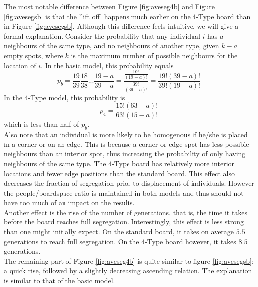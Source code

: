 The most notable difference between Figure \ref{fig:aveseg4b} and Figure \ref{fig:avesegsb} is that the 'lift off' happens much earlier on the 4-Type board than in Figure \ref{fig:avesegsb}. 
Although this difference feels intuitive, we will give a formal explanation. 
Consider the probability that any individual $i$ has $a$ neighbours of the same type, and no neighbours of another type, given $k-a$ empty spots, where $k$ is the maximum number of possible neighbours for the location of $i$. 
In the basic model, this probability equals
\[
p_b = \frac{19}{39}\frac{18}{38}...\frac{19-a}{39-a} = \frac{\frac{19!}{(19-a)!}}{\frac{39!}{(39-a)!}} = \frac{19!(39-a)!}{39!(19-a)!}
\]
In the 4-Type model, this probability is
\[
p_4 = \frac{15!(63-a)!}{63!(15-a)!}
\]
which is less than half of $p_b$.\\

Also note that an individual is more likely to be homogenous if he/she is placed in a corner or on an edge. 
This is because a corner or edge spot has less possible neighbours than an interior spot, thus increasing the probability of only having neighbours of the same type. 
The 4-Type board has relatively more interior locations and fewer edge positions than the standard board. This effect also decreases the fraction of segregation prior to displacement of individuals.
However the people/boardspace ratio is maintained in both models and thus should not have too much of an impact on the results.\\

Another effect is the rise of the number of generations, that is, the time it takes before the board reaches full segregation. 
Interestingly, this effect is less strong than one might initially expect. 
On the standard board, it takes on average $5.5$ generations to reach full segregation. On the 4-Type board however, it takes $8.5$ generations.\\

The remaining part of Figure \ref{fig:aveseg4b} is quite similar to figure \ref{fig:avesegsb}: a quick rise, followed by a slightly decreasing ascending relation. 
The explanation is similar to that of the basic model.
